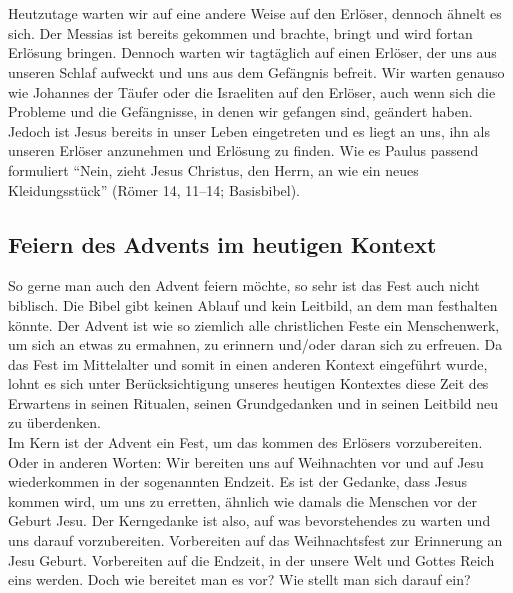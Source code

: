 \\~\\
Heutzutage warten wir auf eine andere Weise auf den Erlöser, dennoch ähnelt es sich. Der Messias ist bereits gekommen und brachte, bringt und wird fortan Erlösung bringen. Dennoch warten wir tagtäglich auf einen Erlöser, der uns aus unseren Schlaf aufweckt und uns aus dem Gefängnis befreit. Wir warten genauso wie Johannes der Täufer oder die Israeliten auf den Erlöser, auch wenn sich die Probleme und die Gefängnisse, in denen wir gefangen sind, geändert haben. Jedoch ist Jesus bereits in unser Leben eingetreten und es liegt an uns, ihn als unseren Erlöser anzunehmen und Erlösung zu finden. Wie es Paulus passend formuliert ``Nein, zieht Jesus Christus, den Herrn, an wie ein neues Kleidungsstück'' (Römer 14, 11--14; Basisbibel).

\subsection{Feiern des Advents im heutigen Kontext}
So gerne man auch den Advent feiern möchte, so sehr ist das Fest auch nicht biblisch. Die Bibel gibt keinen Ablauf und kein Leitbild, an dem man festhalten könnte. Der Advent ist wie so ziemlich alle christlichen Feste ein Menschenwerk, um sich an etwas zu ermahnen, zu erinnern und/oder daran sich zu erfreuen. Da das Fest im Mittelalter und somit in einen anderen Kontext eingeführt wurde, lohnt es sich unter Berücksichtigung unseres heutigen Kontextes diese Zeit des Erwartens in seinen Ritualen, seinen Grundgedanken und in seinen Leitbild neu zu überdenken.  
\\
Im Kern ist der Advent ein Fest, um das kommen des Erlösers vorzubereiten. Oder in anderen Worten: Wir bereiten uns auf Weihnachten vor und auf Jesu wiederkommen in der sogenannten Endzeit. Es ist der Gedanke, dass Jesus kommen wird, um uns zu erretten, ähnlich wie damals die Menschen vor der Geburt Jesu. Der Kerngedanke ist also, auf was bevorstehendes zu warten und uns darauf vorzubereiten. Vorbereiten auf das Weihnachtsfest zur Erinnerung an Jesu Geburt. Vorbereiten auf die Endzeit, in der unsere Welt und Gottes Reich eins werden. Doch wie bereitet man es vor? Wie stellt man sich darauf ein? 

